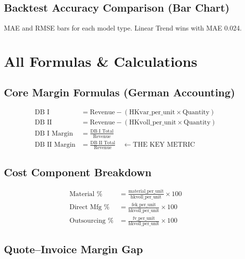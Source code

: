 \documentclass[11pt,a4paper]{article}
\begin{document}
\subsection{Backtest Accuracy Comparison (Bar Chart)}
MAE and RMSE bars for each model type. Linear Trend wins with MAE 0.024.

\section{All Formulas \& Calculations}

\subsection{Core Margin Formulas (German Accounting)}

\begin{align}
\text{DB I} &= \text{Revenue} - (\text{HKvar\_per\_unit} \times \text{Quantity}) \label{eq:db1} \\
\text{DB II} &= \text{Revenue} - (\text{HKvoll\_per\_unit} \times \text{Quantity}) \label{eq:db2} \\
\text{DB I Margin} &= \frac{\text{DB I Total}}{\text{Revenue}} \\
\text{DB II Margin} &= \frac{\text{DB II Total}}{\text{Revenue}} \quad \leftarrow \text{THE KEY METRIC}
\end{align}

\subsection{Cost Component Breakdown}

\begin{align}
\text{Material \%} &= \frac{\text{material\_per\_unit}}{\text{hkvoll\_per\_unit}} \times 100 \\
\text{Direct Mfg \%} &= \frac{\text{fek\_per\_unit}}{\text{hkvoll\_per\_unit}} \times 100 \\
\text{Outsourcing \%} &= \frac{\text{fv\_per\_unit}}{\text{hkvoll\_per\_unit}} \times 100
\end{align}

\subsection{Quote--Invoice Margin Gap}
\end{document}
